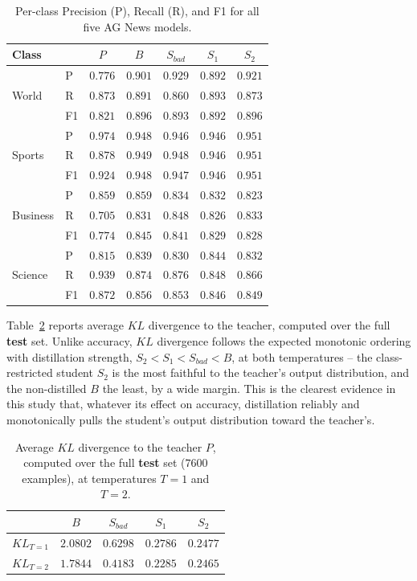 \documentclass[conference]{IEEEtran}
\begin{document}
\begin{table}[h!]
\centering
\caption{Per-class Precision (P), Recall (R), and F1 for all five AG News models.}
\footnotesize
\begin{tabular}{|l|l|c|c|c|c|c|}
\hline
Class & & $P$ & $B$ & $S_{bad}$ & $S_1$ & $S_2$ \\ \hline
\multirow{3}{*}{World}
 & P & $0.776$ & $0.901$ & $0.929$ & $0.892$ & $0.921$ \\
 & R & $0.873$ & $0.891$ & $0.860$ & $0.893$ & $0.873$ \\
 & F1 & $0.821$ & $0.896$ & $0.893$ & $0.892$ & $0.896$ \\ \hline
\multirow{3}{*}{Sports}
 & P & $0.974$ & $0.948$ & $0.946$ & $0.946$ & $0.951$ \\
 & R & $0.878$ & $0.949$ & $0.948$ & $0.946$ & $0.951$ \\
 & F1 & $0.924$ & $0.948$ & $0.947$ & $0.946$ & $0.951$ \\ \hline
\multirow{3}{*}{Business}
 & P & $0.859$ & $0.859$ & $0.834$ & $0.832$ & $0.823$ \\
 & R & $0.705$ & $0.831$ & $0.848$ & $0.826$ & $0.833$ \\
 & F1 & $0.774$ & $0.845$ & $0.841$ & $0.829$ & $0.828$ \\ \hline
\multirow{3}{*}{Science}
 & P & $0.815$ & $0.839$ & $0.830$ & $0.844$ & $0.832$ \\
 & R & $0.939$ & $0.874$ & $0.876$ & $0.848$ & $0.866$ \\
 & F1 & $0.872$ & $0.856$ & $0.853$ & $0.846$ & $0.849$ \\ \hline
\end{tabular}
\label{tab:agnews_perclass}
\end{table}

Table~\ref{tab:agnews_kl} reports average $KL$ divergence to the teacher, computed over the full \textbf{test} set. Unlike accuracy, $KL$ divergence follows the expected monotonic ordering with distillation strength, $S_2 < S_1 < S_{bad} < B$, at both temperatures -- the class-restricted student $S_2$ is the most faithful to the teacher's output distribution, and the non-distilled $B$ the least, by a wide margin. This is the clearest evidence in this study that, whatever its effect on accuracy, distillation reliably and monotonically pulls the student's output distribution toward the teacher's.

\begin{table}[h!]
\centering
\caption{Average $KL$ divergence to the teacher $P$, computed over the full \textbf{test} set ($7600$ examples), at temperatures $T=1$ and $T=2$.}
    \begin{tabular}{|l|c|c|c|c|}
        \hline
        & $B$ & $S_{bad}$ & $S_1$ & $S_2$ \\ \hline
        $KL_{T=1}$ & $2.0802$ & $0.6298$ & $0.2786$ & $0.2477$ \\
        $KL_{T=2}$ & $1.7844$ & $0.4183$ & $0.2285$ & $0.2465$ \\ \hline
    \end{tabular}
    \label{tab:agnews_kl}
\end{table}
\end{document}
